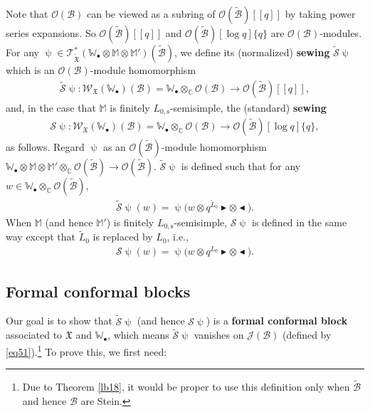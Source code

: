 \documentclass[11pt,b5paper,notitlepage]{article}
\theoremstyle{definition}
\theoremstyle{plain}
\newcommand{\fk}{\mathfrak}
\newcommand{\mc}{\mathcal}
\newcommand{\wtd}{\widetilde}
\newcommand{\scr}{\mathscr}
\newcommand{\blt}{\bullet}
\newcommand{\Wbb}{\mathbb W}
\newcommand{\Mbb}{\mathbb M}
\newcommand{\Cbb}{\mathbb C}
\newcommand{\btl}{\blacktriangleleft}
\newcommand{\btr}{\blacktriangleright}
\newcommand{\Lss}{{L_{0,\mathrm{s}}}}
\numberwithin{equation}{section}
\begin{document}
Note that $\scr O(\mc B)$ can be viewed as a subring of $\scr O(\wtd{\mc B})[[q]]$ by taking power series expansions. So $\scr O(\wtd{\mc B})[[q]]$ and $\scr O(\wtd{\mc B})[\log q]\{q\}$ are $\scr O(\mc B)$-modules.  For any $\uppsi\in\scr T_{\wtd{\fk X}}^*(\Wbb_\blt\otimes\Mbb\otimes\Mbb')(\wtd{\mc B})$, we define its (normalized) \textbf{sewing} $\wtd{\mc S}\uppsi$ which is an $\scr O(\mc B)$-module homomorphism \index{S@$\wtd{\mc S}\uppsi,\mc S\uppsi$}
\begin{align*}
\wtd{\mc S}\uppsi:\scr W_{\fk X}(\Wbb_\blt)(\mc B)=\Wbb_\blt\otimes_\Cbb\scr O(\mc B)\rightarrow\scr O(\wtd{\mc B})[[q]],
\end{align*}
and, in the case that $\Mbb$ is finitely $\Lss$-semisimple, the (standard) \textbf{sewing}
\begin{align*}
\mc S\uppsi:\scr W_{\fk X}(\Wbb_\blt)(\mc B)=\Wbb_\blt\otimes_\Cbb\scr O(\mc B)\rightarrow\scr O(\wtd{\mc B})[\log q]\{q\},
\end{align*}
as follows. Regard $\uppsi$ as an $\scr O(\wtd{\mc B})$-module homomorphism $\Wbb_\blt\otimes\Mbb\otimes\Mbb'\otimes_\Cbb\scr O(\wtd{\mc B})\rightarrow \scr O(\wtd{\mc B})$. $\wtd{\mc S}\uppsi$ is defined such that for any  $w\in\Wbb_\blt\otimes_\Cbb\scr O(\wtd{\mc B})$,
\begin{align}
\wtd{\mc S}\uppsi(w)=\uppsi\big(w\otimes q^{\wtd L_0}\btr\otimes\btl\big).
\end{align}
When $\Mbb$ (and hence $\Mbb'$) is finitely $\Lss$-semisimple, $\mc S\uppsi$ is defined in the same way except that $\wtd L_0$ is replaced by $L_0$, i.e.,
\begin{align}
{\mc S}\uppsi(w)=\uppsi\big(w\otimes q^{L_0}\btr\otimes\btl\big).\label{eq105}
\end{align}



\subsection*{Formal conformal blocks}

Our goal is to show that $\wtd{\mc S}\uppsi$ (and hence $\mc S\uppsi$) is a \textbf{formal conformal block} associated to $\fk X$ and $\Wbb_\blt$, which means $\wtd{\mc S}\uppsi$ vanishes on $\scr J(\mc B)$ (defined by \eqref{eq51}).\footnote{Due to Theorem \ref{lb18}, it would be proper to use this definition only when $\wtd{\mc B}$ and hence $\mc B$ are Stein.} To prove this, we first need:
\end{document}
